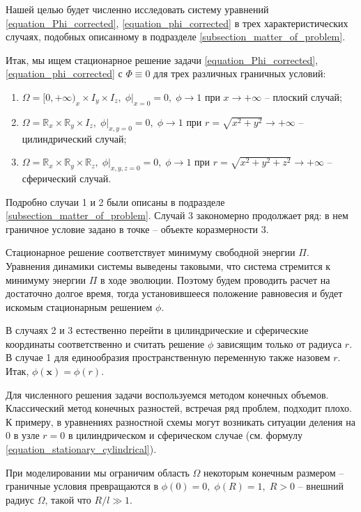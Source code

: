 \documentclass[a4paper,12pt]{article}
\theoremstyle{plain}
\theoremstyle{definition}
\begin{document}
Нашей целью будет численно исследовать систему уравнений \eqref{equation_Phi_corrected}, \eqref{equation_phi_corrected} в трех характеристических случаях, подобных описанному в подразделе \ref{subsection_matter_of_problem}.

Итак, мы ищем стационарное решение задачи \eqref{equation_Phi_corrected}, \eqref{equation_phi_corrected} с $\Phi \equiv 0$ для трех различных граничных условий:
\begin{enumerate}
    \item $\Omega = [0, +\infty)_x \times I_y \times I_z, \; \phi|_{x = 0} = 0, \; \phi \to 1$ при $x \to +\infty$ -- плоский случай;
    \item $\Omega = \mathbb{R}_x \times \mathbb{R}_y \times I_z, \; \phi|_{x, y = 0} = 0, \; \phi \to 1$ при $r = \sqrt{x^2 + y^2} \to +\infty$ -- цилиндрический случай;
    \item $\Omega = \mathbb{R}_x \times \mathbb{R}_y \times \mathbb{R}_z, \; \phi|_{x, y, z = 0} = 0, \; \phi \to 1$ при $r = \sqrt{x^2 + y^2 + z^2} \to +\infty$ -- сферический случай.
\end{enumerate}
Подробно случаи 1 и 2 были описаны в подразделе \ref{subsection_matter_of_problem}. Случай 3 закономерно продолжает ряд: в нем граничное условие задано в точке -- объекте коразмерности 3.

Стационарное решение соответствует минимуму свободной энергии $\Pi$. Уравнения динамики системы выведены таковыми, что система стремится к минимуму энергии $\Pi$ в ходе эволюции. Поэтому будем проводить расчет на достаточно долгое время, тогда установившееся положение равновесия и будет искомым стационарным решением $\phi$.

В случаях 2 и 3 естественно перейти в цилиндрические и сферические координаты соответственно и считать решение $\phi$ зависящим только от радиуса $r$. В случае 1 для единообразия пространственную переменную также назовем $r$. Итак, $\phi(\mathbf{x}) = \phi(r)$.

Для численного решения задачи воспользуемся методом конечных объемов. \linebreak Классический метод конечных разностей, встречая ряд проблем, подходит плохо. К примеру, в уравнениях разностной схемы могут возникать ситуации деления на 0 в узле $r = 0$ в цилиндрическом и сферическом случае (см. формулу \eqref{equation_stationary_cylindrical}).

При моделировании мы ограничим область $\Omega$ некоторым конечным размером -- граничные условия превращаются в $\phi(0) = 0, \; \phi(R) = 1, \; R > 0$ -- внешний радиус $\Omega$, такой что $R / l \gg 1$.
\end{document}

